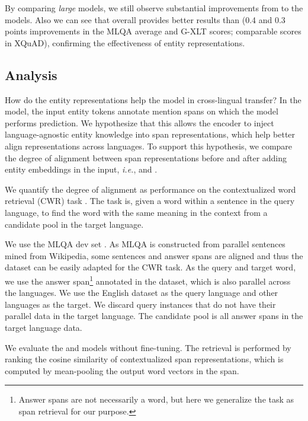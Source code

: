 \documentclass[11pt]{article}
\newcommand{\minisection}[1]{\noindent{\bf {#1}.}}
\begin{document}
By comparing {\it large} models, we still observe substantial improvements from \xlmr{}\la{} to the \mluke{} models.
Also we can see that \mlukeE{}\la{} overall provides better results than \mlukeW{}\la{} (0.4 and 0.3 points improvements in the MLQA average and G-XLT scores; comparable scores in XQuAD), confirming the effectiveness of entity representations.


\subsection{Analysis}
\label{subsec:qa_analysis}

How do the entity representations help the model in cross-lingual transfer?
In the \mlukeE{} model, the input entity tokens annotate mention spans on which the model performs prediction.
We hypothesize that this allows the encoder to inject language-agnostic entity knowledge into span representations, which help better align representations across languages.
To support this hypothesis, we compare the degree of alignment between span representations before and after adding entity embeddings in the input, {\it i.e.}, \mlukeW{} and \mlukeE{}.

\minisection{Task}
We quantify the degree of alignment as performance on the contextualized word retrieval (CWR) task \citep{Cao2020MultilingualAO}. The task is, given a word within a sentence in the query language, to find the word with the same meaning in the context from a candidate pool in the target language.

\minisection{Dataset}
We use the MLQA dev set \citep{lewis-etal-2020-mlqa}.
As MLQA is constructed from parallel sentences mined from Wikipedia, some sentences and answer spans are aligned and thus the dataset can be easily adapted for the CWR task.
As the query and target word, we use the answer span\footnote{Answer spans are not necessarily a word, but here we generalize the task as span retrieval for our purpose.} annotated in the dataset, which is also parallel across the languages.
We use the English dataset as the query language and other languages as the target.
We discard query instances that do not have their parallel data in the target language.
The candidate pool is all answer spans in the target language data.

\minisection{Models}
We evaluate the \mlukeW{}\ba{} and \mlukeE{}\ba{} models without fine-tuning.
The retrieval is performed by ranking the cosine similarity of contextualized span representations, which is computed by mean-pooling the output word vectors in the span.
\end{document}
